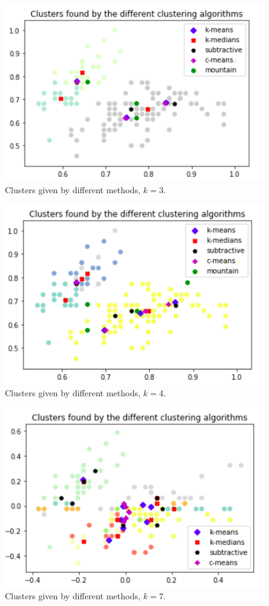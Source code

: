\documentclass[conference]{IEEEtran}
\begin{document}
\begin{figure}[ht!]
    \centering
    \includegraphics[scale = 0.4]{figures/iris/k3.png}
    \caption{Clusters given by different methods, $k = 3$.}
    \label{fig:k3}
\end{figure}

\begin{figure}[ht!]
    \centering
    \includegraphics[scale = 0.4]{figures/iris/k4.png}
    \caption{Clusters given by different methods, $k = 4$.}
    \label{fig:k4}
\end{figure}

\begin{figure}[ht!]
    \centering
    \includegraphics[scale = 0.4]{figures/iris/k7.png}
    \caption{Clusters given by different methods, $k = 7$.}
    \label{fig:k7}
\end{figure}
\end{document}
